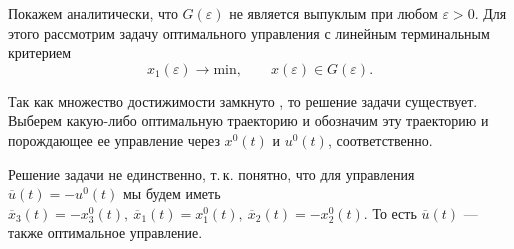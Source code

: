 \documentclass[../main.tex]{subfiles}
\begin{document}
Покажем аналитически, что $G(\varepsilon)$ не является выпуклым при любом $\varepsilon >0$.
Для этого рассмотрим задачу оптимального управления с линейным терминальным критерием
\begin{equation}\label{problem}
	x_1(\varepsilon) \rightarrow \mathrm{min}, \qquad
	x(\varepsilon) \in G(\varepsilon).
\end{equation}

Так как множество достижимости замкнуто \cite{GusZyk2017}, то решение задачи существует. Выберем какую-либо оптимальную траекторию и обозначим эту траекторию и порождающее ее управление через $x^0(t) $ и $ u^0(t) $, соответственно.

Решение задачи не единственно, т.\,к. понятно, что для управления $ \overline{u}(t) = -u^0(t) $ мы будем иметь  $ \overline{x}_3(t) = -x_3^0(t), \ \overline{x}_1(t) = x_1^0(t), \ \overline{x}_2(t) = -x_2^0(t) $. То есть $ \overline{u}(t) $ --- также оптимальное управление.
\end{document}
